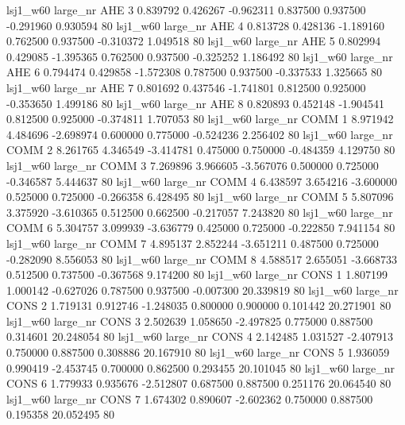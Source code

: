     lsj1_w60   large_nr      AHE                 3  0.839792  0.426267  -0.962311 0.837500 0.937500 -0.291960    0.930594 80
    lsj1_w60   large_nr      AHE                 4  0.813728  0.428136  -1.189160 0.762500 0.937500 -0.310372    1.049518 80
    lsj1_w60   large_nr      AHE                 5  0.802994  0.429085  -1.395365 0.762500 0.937500 -0.325252    1.186492 80
    lsj1_w60   large_nr      AHE                 6  0.794474  0.429858  -1.572308 0.787500 0.937500 -0.337533    1.325665 80
    lsj1_w60   large_nr      AHE                 7  0.801692  0.437546  -1.741801 0.812500 0.925000 -0.353650    1.499186 80
    lsj1_w60   large_nr      AHE                 8  0.820893  0.452148  -1.904541 0.812500 0.925000 -0.374811    1.707053 80
    lsj1_w60   large_nr     COMM                 1  8.971942  4.484696  -2.698974 0.600000 0.775000 -0.524236    2.256402 80
    lsj1_w60   large_nr     COMM                 2  8.261765  4.346549  -3.414781 0.475000 0.750000 -0.484359    4.129750 80
    lsj1_w60   large_nr     COMM                 3  7.269896  3.966605  -3.567076 0.500000 0.725000 -0.346587    5.444637 80
    lsj1_w60   large_nr     COMM                 4  6.438597  3.654216  -3.600000 0.525000 0.725000 -0.266358    6.428495 80
    lsj1_w60   large_nr     COMM                 5  5.807096  3.375920  -3.610365 0.512500 0.662500 -0.217057    7.243820 80
    lsj1_w60   large_nr     COMM                 6  5.304757  3.099939  -3.636779 0.425000 0.725000 -0.222850    7.941154 80
    lsj1_w60   large_nr     COMM                 7  4.895137  2.852244  -3.651211 0.487500 0.725000 -0.282090    8.556053 80
    lsj1_w60   large_nr     COMM                 8  4.588517  2.655051  -3.668733 0.512500 0.737500 -0.367568    9.174200 80
    lsj1_w60   large_nr     CONS                 1  1.807199  1.000142  -0.627026 0.787500 0.937500 -0.007300   20.339819 80
    lsj1_w60   large_nr     CONS                 2  1.719131  0.912746  -1.248035 0.800000 0.900000  0.101442   20.271901 80
    lsj1_w60   large_nr     CONS                 3  2.502639  1.058650  -2.497825 0.775000 0.887500  0.314601   20.248054 80
    lsj1_w60   large_nr     CONS                 4  2.142485  1.031527  -2.407913 0.750000 0.887500  0.308886   20.167910 80
    lsj1_w60   large_nr     CONS                 5  1.936059  0.990419  -2.453745 0.700000 0.862500  0.293455   20.101045 80
    lsj1_w60   large_nr     CONS                 6  1.779933  0.935676  -2.512807 0.687500 0.887500  0.251176   20.064540 80
    lsj1_w60   large_nr     CONS                 7  1.674302  0.890607  -2.602362 0.750000 0.887500  0.195358   20.052495 80

